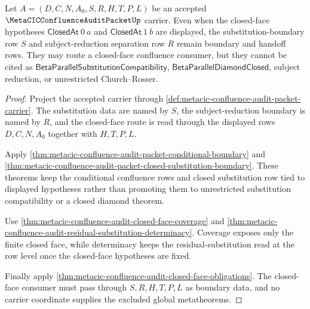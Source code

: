 \begin{theorem}
\label{thm:metacic-confluence-audit-closed-face-row-separation}
Let $A=(D,C,N,A_0,S,R,H,T,P,L)$ be an accepted $\MetaCICConfluenceAuditPacketUp$ carrier. Even when the closed-face hypotheses $\mathsf{ClosedAt}\ 0\ a$ and $\mathsf{ClosedAt}\ 1\ b$ are displayed, the substitution-boundary row $S$ and subject-reduction separation row $R$ remain boundary and handoff rows. They may route a closed-face confluence consumer, but they cannot be cited as $\mathsf{BetaParallelSubstitutionCompatibility}$, $\mathsf{BetaParallelDiamondClosed}$, subject reduction, or unrestricted Church--Rosser.
\end{theorem}
\begin{proof}
Project the accepted carrier through \autoref{def:metacic-confluence-audit-packet-carrier}. The substitution data are named by $S$, the subject-reduction boundary is named by $R$, and the closed-face route is read through the displayed rows $D,C,N,A_0$ together with $H,T,P,L$.

Apply \autoref{thm:metacic-confluence-audit-packet-conditional-boundary} and \autoref{thm:metacic-confluence-audit-packet-closed-substitution-boundary}. These theorems keep the conditional confluence rows and closed substitution row tied to displayed hypotheses rather than promoting them to unrestricted substitution compatibility or a closed diamond theorem.

Use \autoref{thm:metacic-confluence-audit-closed-face-coverage} and \autoref{thm:metacic-confluence-audit-residual-substitution-determinacy}. Coverage exposes only the finite closed face, while determinacy keeps the residual-substitution read at the row level once the closed-face hypotheses are fixed.

Finally apply \autoref{thm:metacic-confluence-audit-closed-face-obligations}. The closed-face consumer must pass through $S,R,H,T,P,L$ as boundary data, and no carrier coordinate supplies the excluded global metatheorems.
\end{proof}

